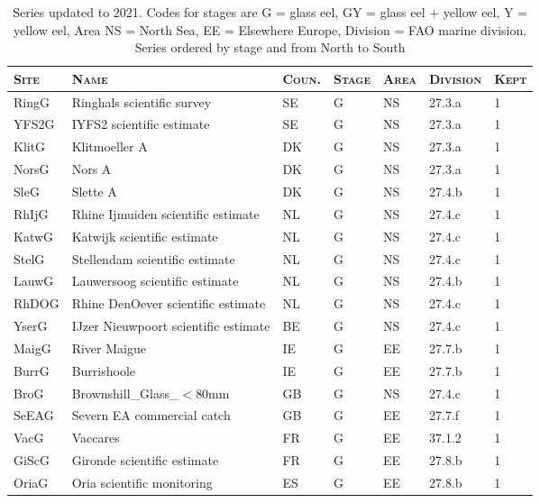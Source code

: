 \begin{table}[htbp]
\centering
\caption{Series updated to 2021. Codes for stages are G = glass eel, GY = glass eel + yellow eel, Y = yellow eel, Area NS = North Sea, EE = Elsewhere Europe, Division = FAO marine division. Series ordered by stage and from North to South} 
\label{table_seriesCY}
\begin{tabularx}{\textwidth}{p{1.3cm}p{6.5cm}p{1cm}p{1cm}p{1cm}p{1cm}p{1.4cm}}
  \hline
\scshape{Site} & \scshape{Name} & \scshape{Coun.} & \scshape{Stage} & \scshape{Area} & \scshape{Division} & \scshape{Kept} \\ 
  \hline
RingG & Ringhals scientific survey & SE & G & NS & 27.3.a &   1 \\ 
  YFS2G & IYFS2 scientific estimate & SE & G & NS & 27.3.a &   1 \\ 
  KlitG & Klitmoeller A & DK & G & NS & 27.3.a &   1 \\ 
  NorsG & Nors A & DK & G & NS & 27.3.a &   1 \\ 
  SleG & Slette A & DK & G & NS & 27.4.b &   1 \\ 
  RhIjG & Rhine Ijmuiden scientific estimate & NL & G & NS & 27.4.c &   1 \\ 
  KatwG & Katwijk scientific estimate & NL & G & NS & 27.4.c &   1 \\ 
  StelG & Stellendam scientific estimate & NL & G & NS & 27.4.c &   1 \\ 
  LauwG & Lauwersoog scientific estimate & NL & G & NS & 27.4.b &   1 \\ 
  RhDOG & Rhine DenOever scientific estimate & NL & G & NS & 27.4.c &   1 \\ 
  YserG & IJzer Nieuwpoort scientific estimate & BE & G & NS & 27.4.c &   1 \\ 
  MaigG & River Maigue & IE & G & EE & 27.7.b &   1 \\ 
  BurrG & Burrishoole & IE & G & EE & 27.7.b &   1 \\ 
  BroG & Brownshill\_Glass\_$<$80mm & GB & G & NS & 27.4.c &   1 \\ 
  SeEAG & Severn EA commercial catch & GB & G & EE & 27.7.f &   1 \\ 
  VacG & Vaccares & FR & G & EE & 37.1.2 &   1 \\ 
  GiScG & Gironde scientific estimate & FR & G & EE & 27.8.b &   1 \\ 
  OriaG & Oria scientific monitoring & ES & G & EE & 27.8.b &   1 \\ 

\end{tabularx}
\end{table}
